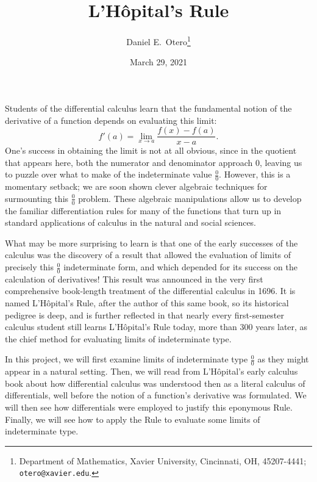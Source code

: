 \documentclass[11pt]{article}
\begin{document}
\title{L'H\^opital's Rule}
\author{Daniel E.~Otero\thanks{Department of Mathematics, Xavier University, Cincinnati, OH, 45207-4441; \texttt{otero@xavier.edu}.
}}
\date{March 29, 2021}
\bigskip



\maketitle

Students of the differential calculus learn that the fundamental notion of the derivative of a function depends on evaluating this limit: $$f'(a)=\lim_{x\to a} \frac{f(x)-f(a)}{x-a}.$$One's success in obtaining the limit is not at all obvious, since in the quotient that appears here, both the numerator and denominator approach $0$, leaving us to puzzle over what to make of the indeterminate value ${\displaystyle \frac00}$. However, this is a momentary setback; we are soon shown clever algebraic techniques for surmounting this ${\displaystyle \frac00}$ problem. These algebraic manipulations allow us to develop the familiar differentiation rules for many of the functions that turn up in standard applications of calculus in the natural and social sciences.

What may be more surprising to learn is that one of the early successes of the calculus was the discovery of a result that allowed the evaluation of limits of precisely this ${\displaystyle \frac00}$ indeterminate form, and which depended for its success on the calculation of derivatives! This result was announced in the very first comprehensive book-length treatment of the differential calculus in 1696. It is named L'H\^opital's Rule, after the author of this same book, so its historical pedigree is deep, and is further reflected in that nearly every first-semester calculus student still learns L'H\^opital's Rule today, more than 300 years later, as the chief method for evaluating limits of indeterminate type.

In this project, we will first examine limits of indeterminate type ${\displaystyle \frac00}$ as they might appear in a natural setting. Then, we will read from L'H\^opital's early calculus book about how differential calculus was understood then as a literal calculus of differentials, well before the notion of a function's derivative was formulated. We will then see how differentials were employed to justify this eponymous Rule. Finally, we will see how to apply the Rule to evaluate some limits of indeterminate type.
\end{document}
